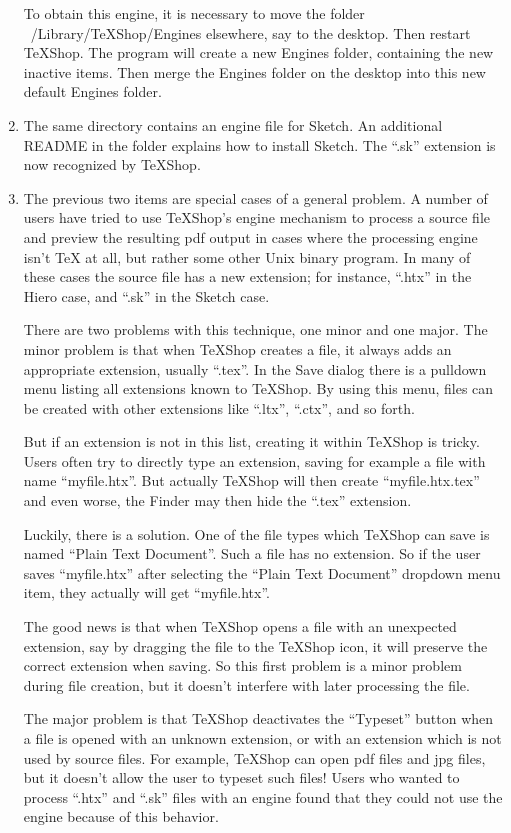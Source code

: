 \documentclass[11pt]{amsart}
\begin{document}
\begin{enumerate}
To obtain this engine, it is necessary to move the folder ~/Library/TeXShop/Engines elsewhere, say to the desktop. Then restart TeXShop. The program will create a new Engines folder, containing the new inactive items. Then merge the Engines folder on the desktop into this new default Engines folder.

 \item The same directory contains an engine file for Sketch. An additional README in the folder explains how to install Sketch. The ``.sk'' extension is now recognized by TeXShop.
 
 \item The previous two items are special cases of a general problem. A number of users have tried to use TeXShop's engine mechanism to process a source file and preview the resulting pdf output in cases where the processing engine isn't TeX at all, but rather some other Unix binary program.  In many of these cases the source file has a new extension; for instance, ``.htx'' in the Hiero case, and ``.sk'' in the Sketch case. 
 
 There are two problems with this technique, one minor and one major. The minor problem is that when TeXShop creates a file, it always adds an appropriate extension, usually ``.tex''. In the Save dialog there is a pulldown menu listing all extensions known to TeXShop. By using this menu, files can be created with other extensions like ``.ltx'', ``.ctx'', and so forth. 
 
 But if an extension is not in this list, creating it within TeXShop is tricky. Users often try to directly type an extension, saving for example a file with name ``myfile.htx''. But actually TeXShop will then create ``myfile.htx.tex'' and even worse, the Finder may then hide the ``.tex'' extension.
 
 Luckily, there is a solution. One of the file types which TeXShop can save is named ``Plain Text Document''. Such a file has no extension. So if the user saves ``myfile.htx'' after selecting the ``Plain Text Document'' dropdown menu item, they actually will get ``myfile.htx''.
 
The good news is that when TeXShop opens a file with an unexpected extension, say by dragging the file to the TeXShop icon, it will preserve the correct extension when saving. So this first problem is a minor problem during file creation, but it doesn't interfere with later processing the file.

The major problem is that TeXShop deactivates the ``Typeset'' button when a file is opened with an unknown extension, or with an extension which is not used by source files. For example, TeXShop can open pdf files and jpg files, but it doesn't allow the user to typeset such files!
Users who wanted to process ``.htx'' and ``.sk'' files with an engine found that they could not use the engine because of this behavior.


\end{enumerate}
\end{document}
